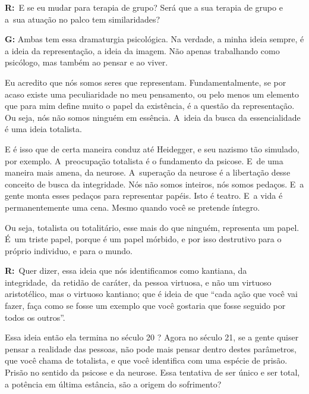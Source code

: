  

\textbf{R:}~E se eu mudar para terapia de grupo? Será que a sua terapia
de grupo e a\textbf{}~sua atuação no palco tem similaridades?

 

\textbf{G:} Ambas tem essa dramaturgia psicológica. Na verdade, a minha
ideia sempre, é a ideia da representação, a ideia da imagem. Não apenas
trabalhando como psicólogo, mas também ao pensar e ao viver.

 

Eu acredito que nós somos seres que representam. Fundamentalmente, se
por acaso existe uma peculiaridade no meu pensamento, ou pelo menos um
elemento que para mim define muito o papel da existência, é a questão da
representação. Ou seja, nós não somos ninguém em essência. A~ideia da
busca da essencialidade é uma ideia totalista.

 

E é isso que de certa maneira conduz até Heidegger, e seu nazismo tão
simulado, por exemplo. A~preocupação totalista é o fundamento da
psicose. E~de uma maneira mais amena, da neurose. A~superação da neurose
é a libertação desse conceito de busca da integridade. Nós não somos
inteiros, nós somos pedaços. E~a gente monta esses pedaços para
representar papéis. Isto é teatro. E~a vida é permanentemente uma cena.
Mesmo quando você se pretende íntegro.

 

Ou seja, totalista ou totalitário, esse mais do que ninguém, representa
um papel. É~um triste papel, porque é um papel mórbido, e por isso
destrutivo para o próprio individuo, e para o mundo.

 

\textbf{R:}~Quer dizer, essa ideia que nós identificamos como kantiana,
da integridade,\textbf{}~da retidão de caráter, da pessoa virtuosa, e
não um virtuoso aristotélico, mas o virtuoso kantiano; que é ideia de
que ``cada ação que você vai fazer, faça como se fosse um exemplo que
você gostaria que fosse seguido por todos os outros''.

 

Essa ideia então ela termina no século 20 ? Agora no século 21, se a
gente quiser pensar a realidade das pessoas, não pode mais pensar dentro
destes parâmetros, que você chama de totalista, e que você identifica
com uma espécie de prisão. Prisão no sentido da psicose e da neurose.
Essa tentativa de ser único e ser total, a potência em última estância,
são a origem do sofrimento?

